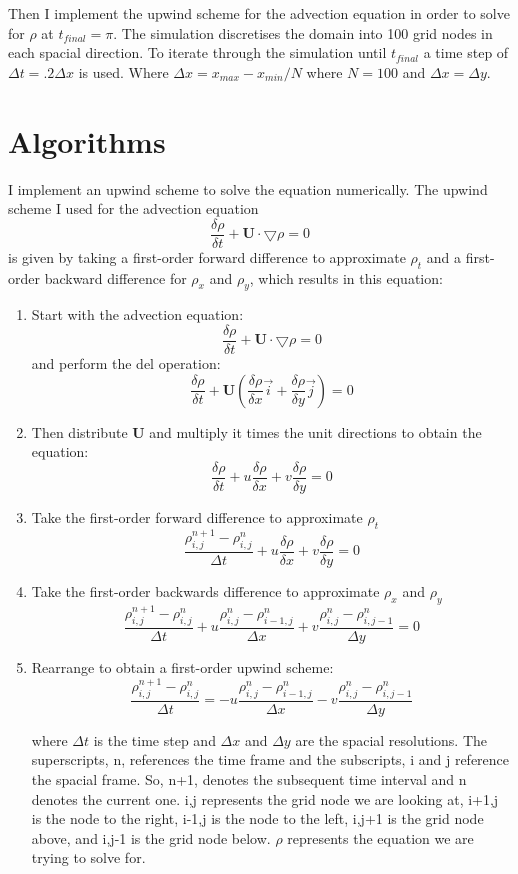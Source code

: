 \documentclass[12pt]{article}
\begin{document}
Then I implement the upwind scheme for the advection equation in order to solve for $ \rho $ at $ t_{final}=\pi $. The simulation discretises the domain into 100 grid nodes in each spacial direction. To iterate through the simulation until $ t_{final} $ a time step of $ \Delta t=.2\Delta x $ is used. Where $ \Delta x = x_{max} - x_{min} / N $ where $ N = 100 $ and $ \Delta x = \Delta y $.

\section{Algorithms}
I implement an upwind scheme to solve the equation numerically. The upwind scheme I used for the advection equation
\begin{equation}
\frac{\delta \rho}{\delta t} + \textbf{U}\cdot \bigtriangledown \rho = 0 
\end{equation}
is given by taking a first-order forward difference to approximate $ \rho_t $ and a first-order backward difference for $\rho_x $ and $ \rho_y$, which results in this equation:
\begin{enumerate}
\item Start with the advection equation:
$$
\frac{\delta \rho}{\delta t} + \textbf{U}\cdot \bigtriangledown \rho = 0 $$
and perform the del operation:
$$
\frac{\delta \rho}{\delta t} + \textbf{U}(\frac{\delta \rho}{\delta x}\vec{i}+\frac{\delta \rho}{\delta y}\vec{j}) = 0
$$
\item Then distribute \textbf{U} and multiply it times the unit directions to obtain the equation:
$$
\frac{\delta \rho}{\delta t} + u\frac{\delta \rho}{\delta x}+v\frac{\delta \rho}{\delta y} = 0
$$
\item Take the first-order forward difference to approximate $ \rho_t $
$$
\frac{\rho_{i,j}^{n+1}-\rho_{i,j}^{n}}{\Delta t} + u\frac{\delta \rho}{\delta x}+v\frac{\delta \rho}{\delta y} = 0
$$
\item Take the first-order backwards difference to approximate $ \rho_x $ and $ \rho_y $
$$
\frac{\rho_{i,j}^{n+1}-\rho_{i,j}^{n}}{\Delta t} + u\frac{\rho_{i,j}^{n}-\rho_{i-1,j}^{n}}{\Delta x}+v\frac{\rho_{i,j}^{n}-\rho_{i,j-1}^{n}}{\Delta y} = 0
$$
\item Rearrange to obtain a first-order upwind scheme:
\begin{equation}
\frac{\rho_{i,j}^{n+1}-\rho_{i,j}^{n}}{\Delta t}= - u\frac{\rho_{i,j}^{n}-\rho_{i-1,j}^{n}}{\Delta x}-v\frac{\rho_{i,j}^{n}-\rho_{i,j-1}^{n}}{\Delta y}
\end{equation}

where $ \Delta t $ is the time step and $ \Delta x $ and $ \Delta y $ are the spacial resolutions. The superscripts, n, references the time frame and the subscripts, i and j reference the spacial frame. So, n+1, denotes the subsequent time interval and n denotes the current one. i,j represents the grid node we are looking at, i+1,j is the node to the right, i-1,j is the node to the left, i,j+1 is the grid node above, and i,j-1 is the grid node below. $\rho$ represents the equation we are trying to solve for.
\end{enumerate}
\end{document}
